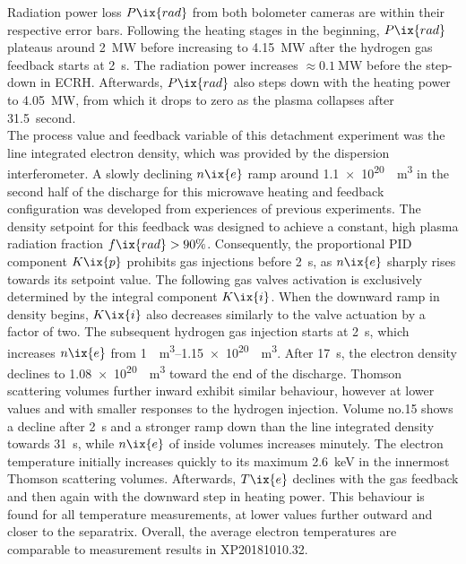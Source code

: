 %
                Radiation power loss $P\ix{rad}$ from both bolometer cameras are within their respective error bars. Following the heating stages in the beginning, $P\ix{rad}$ plateaus around \SI{2}{\mega\watt} before increasing to \SI{4.15}{\mega\watt} after the hydrogen gas feedback starts at \SI{2}{\second}. The radiation power increases $\approx\SI{0.1}{\mega\watt}$ before the step-down in ECRH. Afterwards, $P\ix{rad}$ also steps down with the heating power to \SI{4.05}{\mega\watt}, from which it drops to zero as the plasma collapses after \SI{31.5}{second}.\\%
                The process value and feedback variable of this detachment experiment was the line integrated electron density, which was provided by the dispersion interferometer. A slowly declining $n\ix{e}$ ramp around \SI[per-mode=reciprocal]{1.1e20}{\per\cubic\meter} in the second half of the discharge for this microwave heating and feedback configuration was developed from experiences of previous experiments. The density setpoint for this feedback was designed to achieve a constant, high plasma radiation fraction $f\ix{rad}>90\%$\cite{Krychowiak2021, Krychowiak2023}. Consequently, the proportional PID component $K\ix{p}$ prohibits gas injections before \SI{2}{\second}, as $n\ix{e}$ sharply rises towards its setpoint value. The following gas valves activation is exclusively determined by the integral component $K\ix{i}$. When the downward ramp in density begins, $K\ix{i}$ also decreases similarly to the valve actuation by a factor of two. The subsequent hydrogen gas injection starts at \SI{2}{\second}, which increases $n\ix{e}$ from \SIrange[per-mode=reciprocal]{1}{1.15e20}{\per\cubic\meter}. After \SI{17}{\second}, the electron density declines to \SI[per-mode=reciprocal]{1.08e20}{\per\cubic\meter} toward the end of the discharge. Thomson scattering volumes further inward exhibit similar behaviour, however at lower values and with smaller responses to the hydrogen injection. Volume no.15 shows a decline after \SI{2}{\second} and a stronger ramp down than the line integrated density towards \SI{31}{\second}, while $n\ix{e}$ of inside volumes increases minutely. The electron temperature initially increases quickly to its maximum \SI{2.6}{\kilo\electronvolt} in the innermost Thomson scattering volumes. Afterwards, $T\ix{e}$ declines with the gas feedback and then again with the downward step in heating power. This behaviour is found for all temperature measurements, at lower values further outward and closer to the separatrix. Overall, the average electron temperatures are comparable to measurement results in XP20181010.32.\\%

